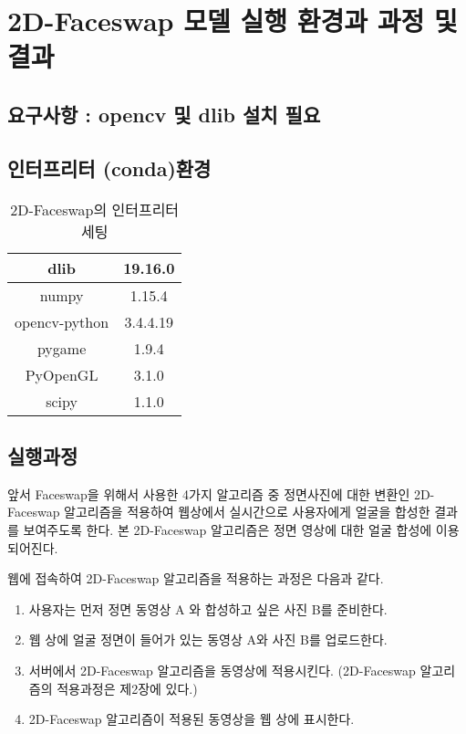 \documentclass{oblivoir}
\begin{document}
\section{ 2D-Faceswap 모델 실행 환경과 과정 및 결과}

 \subsection{요구사항 :  opencv 및 dlib 설치 필요}
 
 \subsection{인터프리터 (conda)환경}

 \begin{table}[h!]
    \centering
        \begin{tabular}{|c|c|}
            \hline\hline
            dlib & 19.16.0 \\ \hline
            numpy & 1.15.4 \\             \hline
            opencv-python & 3.4.4.19\\             \hline
            pygame & 1.9.4 \\            \hline
            PyOpenGL & 3.1.0 \\            \hline
            scipy  &  1.1.0\\
            \hline\hline
        \end{tabular}
	\caption{2D-Faceswap의 인터프리터 세팅  }
\end{table}

\subsection{실행과정} 

 앞서 Faceswap을 위해서 사용한 4가지 알고리즘 중 정면사진에 대한 변환인 2D-Faceswap 알고리즘을 적용하여 웹상에서 실시간으로 사용자에게 얼굴을 합성한 결과를 보여주도록 한다. 본 2D-Faceswap 알고리즘은 정면 영상에 대한 얼굴 합성에 이용되어진다. 

 웹에 접속하여 2D-Faceswap 알고리즘을 적용하는 과정은 다음과 같다. 
\begin{enumerate}
    \item  사용자는 먼저 정면 동영상 A 와 합성하고 싶은 사진 B를 준비한다.
    \item 웹 상에 얼굴 정면이 들어가 있는 동영상 A와 사진 B를 업로드한다.
    \item 서버에서 2D-Faceswap 알고리즘을 동영상에 적용시킨다. (2D-Faceswap 알고리즘의 적용과정은 제2장에 있다.)
    \item 2D-Faceswap 알고리즘이 적용된 동영상을 웹 상에 표시한다.
\end{enumerate}
\end{document}
